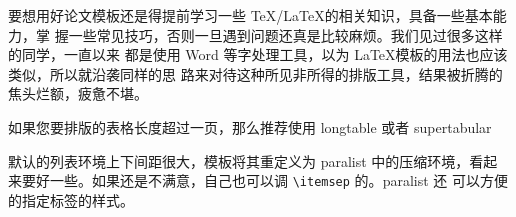 要想用好论文模板还是得提前学习一些 \TeX/\LaTeX{}的相关知识，具备一些基本能力，掌
握一些常见技巧，否则一旦遇到问题还真是比较麻烦。我们见过很多这样的同学，一直以来
都是使用 Word 等字处理工具，以为 \LaTeX{}模板的用法也应该类似，所以就沿袭同样的思
路来对待这种所见非所得的排版工具，结果被折腾的焦头烂额，疲惫不堪。

如果您要排版的表格长度超过一页，那么推荐使用 \textsf{longtable} 或者 \textsf{supertabular} 

默认的列表环境上下间距很大，模板将其重定义为 \textsf{paralist} 中的压缩环境，看起
来要好一些。如果还是不满意，自己也可以调 \verb|\itemsep| 的。\textsf{paralist} 还
可以方便的指定标签的样式。

